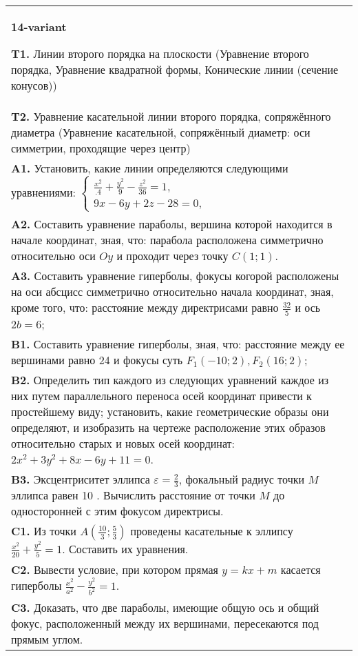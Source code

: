 \documentclass{article}
\begin{document}
\begin{tabular}{m{17cm}}
\textbf{14-variant}
\newline

\textbf{T1.} Линии второго порядка на плоскости (Уравнение второго порядка, Уравнение квадратной формы, Конические линии (сечение конусов)) \\
\textbf{T2.} Уравнение касательной линии второго порядка, сопряжённого диаметра (Уравнение касательной, сопряжённый диаметр: оси симметрии, проходящие через центр) \\
\textbf{A1.} Установить, какие линии определяются следующими уравнениями: $\left\{\begin{array}{l}\frac{x^2}{.4}+\frac{y^2}{9}-\frac{z^2}{36}=1, \\ 9 x-6 y+2 z-28=0,\end{array}\right.$ \\
\textbf{A2.} Составить уравнение параболы, вершина которой находится в начале координат, зная, что: парабола расположена симметрично относительно оси $O y$ и проходит через точку $C(1 ; 1)$. \\
\textbf{A3.} Составить уравнение гиперболы, фокусы когорой расположены на оси абсцисс симметрично относительно начала координат, зная, кроме того, что: расстояние между директрисами равно $\frac{32}{5}$ и ось $2 b=6$; \\
\textbf{B1.} Составить уравнение гиперболы, зная, что: расстояние между ее вершинами равно 24 и фокусы суть $F_1(-10 ; 2), F_2(16 ; 2)$; \\
\textbf{B2.} Определить тип каждого из следующих уравнений каждое из них путем параллельного переноса осей координат привести к простейшему виду; установить, какие геометрические образы они определяют, и изобразить на чертеже расположение этих образов относительно старых и новых осей координат: $2 x^2+3 y^2+8 x-6 y+11=0$. \\
\textbf{B3.} Эксцентриситет эллипса $\varepsilon=\frac{2}{3}$, фокальный радиус точки $M$ эллипса равен 10 . Вычислить расстояние от точки $M$ до односторонней с этим фокусом директрисы. \\
\textbf{C1.} Из точки $A\left(\frac{10}{3} ; \frac{5}{3}\right)$ проведены касательные к эллипсу $\frac{x^2}{20}+\frac{y^2}{5}=1$. Составить их уравнения. \\
\textbf{C2.} Вывести условие, при котором прямая $y=k x+m$ касается гиперболы $\frac{x^2}{a^2}-\frac{y^2}{b^2}=1$. \\
\textbf{C3.} Доказать, что две параболы, имеющие общую ось и общий фокус, расположенный между их вершинами, пересекаются под прямым углом. \\

\end{tabular}
\vspace{1cm}
\end{document}
